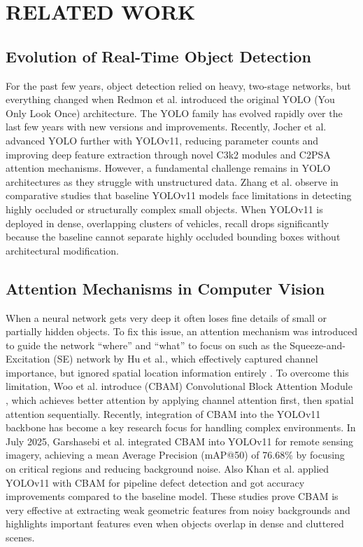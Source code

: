 \documentclass[conference]{IEEEtran}
\begin{document}
\section{RELATED WORK}

\subsection{Evolution of Real-Time Object Detection}

For the past few years, object detection relied on heavy, two-stage networks, but everything changed when Redmon et al. introduced the original YOLO (You Only Look Once) architecture\cite{redmon2016you}. The YOLO family has evolved rapidly over the last few years with new versions and improvements. Recently, Jocher et al. advanced YOLO further with YOLOv11, reducing parameter counts\cite{Jocher2025YOLOv11} and improving deep feature extraction through novel C3k2 modules and C2PSA attention mechanisms\cite{9a}. However, a fundamental challenge remains in YOLO architectures as they struggle with unstructured data. Zhang et al. observe in comparative studies that baseline YOLOv11 models face limitations in detecting highly occluded or structurally complex small objects\cite{zhang2025trinext}. When YOLOv11 is deployed in dense, overlapping clusters of vehicles, recall drops significantly because the baseline cannot separate highly occluded bounding boxes without architectural modification.

\subsection{Attention Mechanisms in Computer Vision}
When a neural network gets very deep it often loses fine details of small or partially hidden objects. To fix this issue, an attention mechanism was introduced to guide the network “where” and “what” to focus on such as the Squeeze-and-Excitation (SE) network by Hu et al., which effectively captured channel importance, but ignored spatial location information entirely \cite{11a}. To overcome this limitation, Woo et al. introduce (CBAM) Convolutional Block Attention Module \cite{Woo2018CBAM}, which achieves better attention by applying channel attention first, then spatial attention sequentially. Recently, integration of CBAM into the YOLOv11 backbone has become a key research focus for handling complex environments. In July 2025, Garshasebi et al.\cite{garshasebi2025improving} integrated CBAM into YOLOv11 for remote sensing imagery, achieving a mean Average Precision (mAP@50) of 76.68\% by focusing on critical regions and reducing background noise. Also Khan et al. applied YOLOv11 with CBAM for pipeline defect detection and got accuracy improvements compared to the baseline model\cite{khan2025pipeline}. These studies prove CBAM is very effective at extracting weak geometric features from noisy backgrounds and highlights important features even when objects overlap in dense and cluttered scenes.
\end{document}
